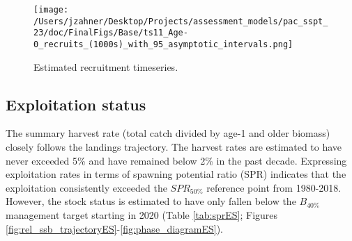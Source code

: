 \documentclass[11pt,
  letterpaper,
]{article}
\begin{document}
\begin{figure}
{\centering
\texttt{[image: /Users/jzahner/Desktop/Projects/assessment\_models/pac\_sspt\_23/doc/FinalFigs/Base/ts11\_Age-0\_recruits\_(1000s)\_with\_95\_asymptotic\_intervals.png]}
}
\caption{Estimated recruitment timeseries.\label{fig:rec_trajectoryES}}
\end{figure}

\hypertarget{exploitation-status}{%
\subsection*{Exploitation status}\label{exploitation-status}}

The summary harvest rate (total catch divided by age-1 and older biomass) closely follows the landings trajectory. The harvest rates are estimated to have never exceeded 5\% and have remained below 2\% in the past decade. Expressing exploitation rates in terms of spawning potential ratio (SPR) indicates that the exploitation consistently exceeded the \(SPR_{50\%}\) reference point from 1980-2018. However, the stock status is estimated to have only fallen below the \(B_{40\%}\) management target starting in 2020 (Table \ref{tab:sprES}; Figures \ref{fig:rel_ssb_trajectoryES}-\ref{fig:phase_diagramES}).

\begingroup\fontsize{10}{12}\selectfont
\begingroup\fontsize{10}{12}\selectfont
\end{document}
